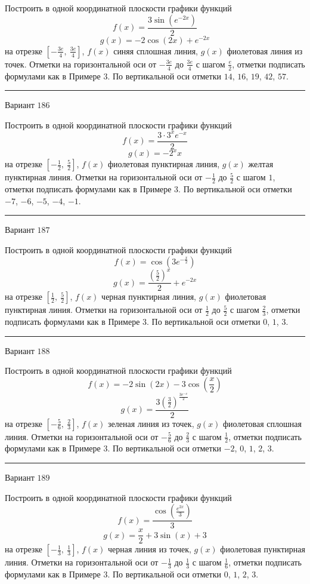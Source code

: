 \documentclass[11pt]{report}
\begin{document}
Построить в одной координатной плоскости графики функций $$f(x) = \frac{3 \sin{\left(e^{- 2 x} \right)}}{2}$$ $$g(x) = - 2 \cos{\left(2 x \right)} + e^{- 2 x}$$ на отрезке $\left[- \frac{3 e}{4}, \  \frac{3 e}{4}\right]$, $f(x)$ синяя сплошная линия, $g(x)$ фиолетовая линия из точек. Отметки на горизонтальной оси от $- \frac{3 e}{4}$ до $\frac{3 e}{4}$ с шагом $\frac{e}{2}$, отметки подписать формулами как в Примере 3. По вертикальной оси отметки $14$, $16$, $19$, $42$, $57$.
\begin{center}
\noindent\rule{8cm}{0.4pt}
\end{center}
Вариант $186$


Построить в одной координатной плоскости графики функций $$f(x) = \frac{3 \cdot 3^{x} e^{- x}}{2}$$ $$g(x) = - 2^{x} x$$ на отрезке $\left[- \frac{1}{2}, \  \frac{5}{2}\right]$, $f(x)$ фиолетовая пунктирная линия, $g(x)$ желтая пунктирная линия. Отметки на горизонтальной оси от $- \frac{1}{2}$ до $\frac{5}{2}$ с шагом $1$, отметки подписать формулами как в Примере 3. По вертикальной оси отметки $-7$, $-6$, $-5$, $-4$, $-1$.
\begin{center}
\noindent\rule{8cm}{0.4pt}
\end{center}
Вариант $187$


Построить в одной координатной плоскости графики функций $$f(x) = \cos{\left(3 e^{- \frac{x}{2}} \right)}$$ $$g(x) = \frac{\left(\frac{5}{2}\right)^{x}}{2} + e^{- 2 x}$$ на отрезке $\left[\frac{1}{2}, \  \frac{5}{2}\right]$, $f(x)$ черная пунктирная линия, $g(x)$ фиолетовая пунктирная линия. Отметки на горизонтальной оси от $\frac{1}{2}$ до $\frac{5}{2}$ с шагом $\frac{2}{3}$, отметки подписать формулами как в Примере 3. По вертикальной оси отметки $0$, $1$, $3$.
\begin{center}
\noindent\rule{8cm}{0.4pt}
\end{center}
Вариант $188$


Построить в одной координатной плоскости графики функций $$f(x) = - 2 \sin{\left(2 x \right)} - 3 \cos{\left(\frac{x}{2} \right)}$$ $$g(x) = \frac{3 \left(\frac{3}{2}\right)^{\frac{3 e^{- x}}{2}}}{2}$$ на отрезке $\left[- \frac{5}{6}, \  \frac{2}{3}\right]$, $f(x)$ зеленая линия из точек, $g(x)$ фиолетовая сплошная линия. Отметки на горизонтальной оси от $- \frac{5}{6}$ до $\frac{2}{3}$ с шагом $\frac{1}{2}$, отметки подписать формулами как в Примере 3. По вертикальной оси отметки $-2$, $0$, $1$, $2$, $3$.
\begin{center}
\noindent\rule{8cm}{0.4pt}
\end{center}
Вариант $189$


Построить в одной координатной плоскости графики функций $$f(x) = \frac{\cos{\left(\frac{e^{2 x}}{3} \right)}}{3}$$ $$g(x) = \frac{x}{2} + 3 \sin{\left(x \right)} + 3$$ на отрезке $\left[- \frac{1}{3}, \  \frac{1}{3}\right]$, $f(x)$ черная линия из точек, $g(x)$ фиолетовая пунктирная линия. Отметки на горизонтальной оси от $- \frac{1}{3}$ до $\frac{1}{3}$ с шагом $\frac{1}{6}$, отметки подписать формулами как в Примере 3. По вертикальной оси отметки $0$, $1$, $2$, $3$.
\end{document}
